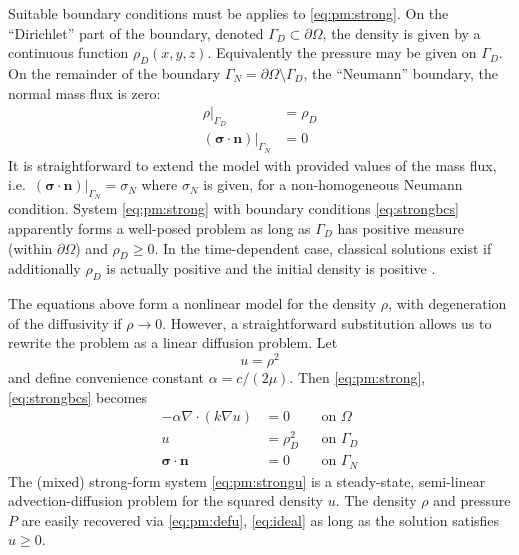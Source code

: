 \documentclass[11pt]{amsart}
\newcommand{\bn}{\mathbf{n}}
\newcommand{\bsigma}{\bm{\sigma}}
\newcommand{\Div}{\nabla\cdot}
\newcommand{\grad}{\nabla}
\begin{document}
Suitable boundary conditions must be applies to \eqref{eq:pm:strong}.  On the ``Dirichlet'' part of the boundary, denoted $\Gamma_D \subset \partial\Omega$, the density is given by a continuous function $\rho_D(x,y,z)$.  Equivalently the pressure may be given on $\Gamma_D$.  On the remainder of the boundary $\Gamma_N = \partial\Omega \setminus \Gamma_D$, the ``Neumann'' boundary, the normal mass flux is zero:
\begin{subequations}
\label{eq:strongbcs}
\begin{align}
\rho|_{\Gamma_D}               &= \rho_D \\
(\bsigma\cdot \bn)|_{\Gamma_N} &= 0
\end{align}
\end{subequations}
It is straightforward to extend the model with provided values of the mass flux, i.e.~$(\bsigma\cdot \bn)|_{\Gamma_N}= \sigma_N$ where $\sigma_N$ is given, for a non-homogeneous Neumann condition.  System \eqref{eq:pm:strong} with boundary conditions \eqref{eq:strongbcs} apparently forms a well-posed problem as long as $\Gamma_D$ has positive measure (within $\partial\Omega$) and $\rho_D\ge 0$.  In the time-dependent case, classical solutions exist if additionally $\rho_D$ is actually positive and the initial density is positive \citep[Theorem 3.1]{Vazquez2007}.

The equations above form a nonlinear model for the density $\rho$, with degeneration of the diffusivity if $\rho \to 0$.  However, a straightforward substitution allows us to rewrite the problem as a linear diffusion problem.  Let
\begin{equation}
u = \rho^2 \label{eq:pm:defu}
\end{equation}
and define convenience constant $\alpha = c/(2\mu)$.  Then \eqref{eq:pm:strong}, \eqref{eq:strongbcs} becomes
\begin{subequations}
\label{eq:pm:strongu}
\begin{align}
- \alpha \Div\left(k \grad u \right) &= 0 & &\text{on } \Omega \label{eq:pm:eqn} \\
u &= \rho_D^2 & &\text{on } \Gamma_D  \label{eq:pm:strongu:bcD} \\
\bsigma\cdot \bn &= 0 & &\text{on } \Gamma_N  \label{eq:pm:strongu:bcN} 
\end{align}
\end{subequations}
The (mixed) strong-form system \eqref{eq:pm:strongu} is a steady-state, semi-linear advection-diffusion problem for the squared density $u$.  The density $\rho$ and pressure $P$ are easily recovered via \eqref{eq:pm:defu}, \eqref{eq:ideal} as long as the solution satisfies $u\ge 0$.
\end{document}

